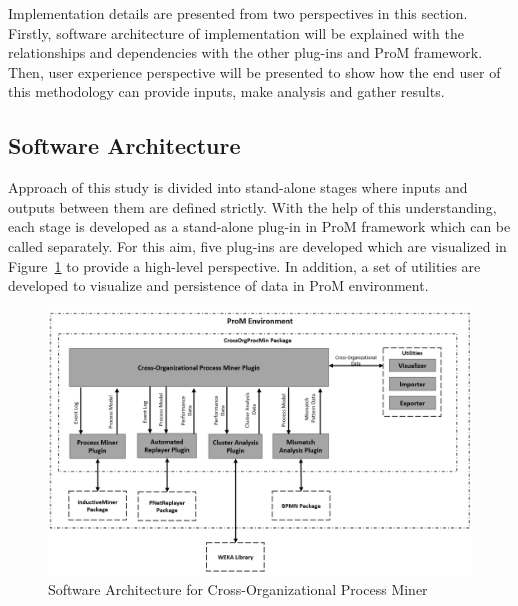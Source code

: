 Implementation details are presented from two perspectives in this section. Firstly, software architecture of implementation will be explained with the relationships and dependencies with the other plug-ins and ProM framework. Then, user experience perspective will be presented to show how the end user of this methodology can provide inputs, make analysis and gather results. 

\subsection{Software Architecture}
\label{subsec:architecture}
Approach of this study is divided into stand-alone stages where inputs and outputs between them are defined strictly. With the help of this understanding, each stage is developed as a stand-alone plug-in in ProM framework which can be called separately. For this aim, five plug-ins are developed which are visualized in Figure~\ref{fig:architecture} to provide a high-level perspective. In addition, a set of utilities are developed to visualize and persistence of data in ProM environment. 
\begin{figure}
  \centering
  \includegraphics[width=\textwidth]{4_methodology/architecture}
  \caption{Software Architecture for  Cross-Organizational Process Miner}
  \label{fig:architecture}
\end{figure}

